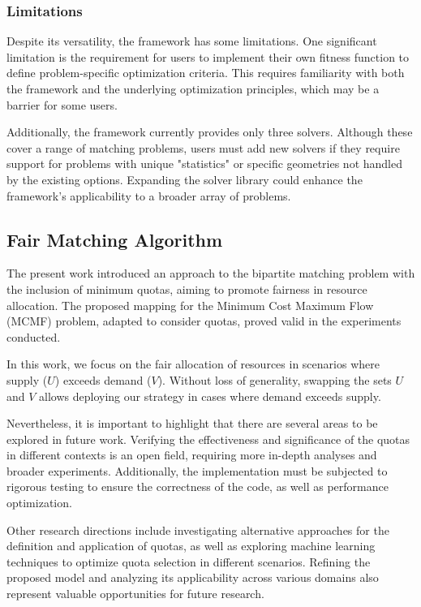         \subsubsection{Limitations}
            Despite its versatility, the framework has some limitations. One significant limitation is the requirement for users to implement their own fitness function to define problem-specific optimization criteria. This requires familiarity with both the framework and the underlying optimization principles, which may be a barrier for some users.
            
            Additionally, the framework currently provides only three solvers. Although these cover a range of matching problems, users must add new solvers if they require support for problems with unique "statistics" or specific geometries not handled by the existing options. Expanding the solver library could enhance the framework's applicability to a broader array of problems.

    \subsection{Fair Matching Algorithm}
        The present work introduced an approach to the bipartite matching problem with the inclusion of minimum quotas, aiming to promote fairness in resource allocation. The proposed mapping for the Minimum Cost Maximum Flow (MCMF) problem, adapted to consider quotas, proved valid in the experiments conducted.

        In this work, we focus on the fair allocation of resources in scenarios where supply ($U$) exceeds demand ($V$).
        Without loss of generality, swapping the sets $U$ and $V$ allows deploying our strategy in cases where demand exceeds supply.
        
        Nevertheless, it is important to highlight that there are several areas to be explored in future work. Verifying the effectiveness and significance of the quotas in different contexts is an open field, requiring more in-depth analyses and broader experiments. Additionally, the implementation must be subjected to rigorous testing to ensure the correctness of the code, as well as performance optimization.
        
        Other research directions include investigating alternative approaches for the definition and application of quotas, as well as exploring machine learning techniques to optimize quota selection in different scenarios. Refining the proposed model and analyzing its applicability across various domains also represent valuable opportunities for future research.
        
